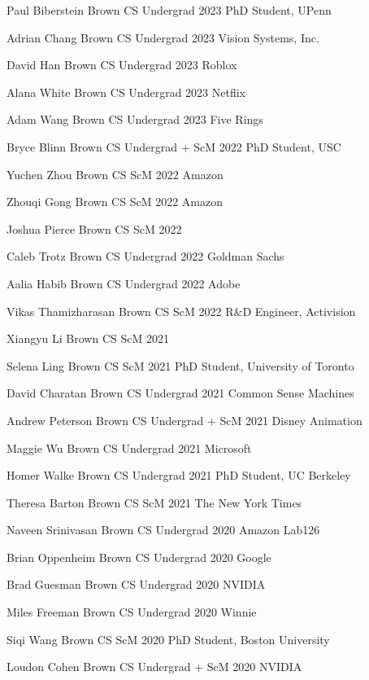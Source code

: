 \documentclass[line,margin]{res}
\begin{document}
\begin{resume}
\alumni
{Paul Biberstein}
{Brown CS Undergrad}
{2023}
{PhD Student, UPenn}

\alumni
{Adrian Chang}
{Brown CS Undergrad}
{2023}
{Vision Systems, Inc.}

\alumni
{David Han}
{Brown CS Undergrad}
{2023}
{Roblox}

\alumni
{Alana White}
{Brown CS Undergrad}
{2023}
{Netflix}

\alumni
{Adam Wang}
{Brown CS Undergrad}
{2023}
{Five Rings}

\alumni
{Bryce Blinn}
{Brown CS Undergrad + ScM}
{2022}	
{PhD Student, USC}

\alumni
{Yuchen Zhou}
{Brown CS ScM}
{2022}
{Amazon}

\alumni
{Zhouqi Gong}
{Brown CS ScM}
{2022}
{Amazon}

\alumni
{Joshua Pierce}
{Brown CS ScM}
{2022}
{}

\alumni
{Caleb Trotz}
{Brown CS Undergrad}
{2022}
{Goldman Sachs}

\alumni
{Aalia Habib}
{Brown CS Undergrad}
{2022}
{Adobe}

\alumni
{Vikas Thamizharasan}
{Brown CS ScM}
{2022}
{R\&D Engineer, Activision}

\alumni
{Xiangyu Li}
{Brown CS ScM}
{2021}
{}

\alumni
{Selena Ling}
{Brown CS ScM}
{2021}
{PhD Student, University of Toronto}

\alumni
{David Charatan}
{Brown CS Undergrad}
{2021}
{Common Sense Machines}

\alumni
{Andrew Peterson}
{Brown CS Undergrad + ScM}
{2021}
{Disney Animation}

\alumni
{Maggie Wu}
{Brown CS Undergrad}
{2021}
{Microsoft}

\alumni
{Homer Walke}
{Brown CS Undergrad}
{2021}
{PhD Student, UC Berkeley}

\alumni
{Theresa Barton}
{Brown CS ScM}
{2021}
{The New York Times}

\alumni
{Naveen Srinivasan}
{Brown CS Undergrad}
{2020}
{Amazon Lab126}

\alumni
{Brian Oppenheim}
{Brown CS Undergrad}
{2020}
{Google}

\alumni
{Brad Guesman}
{Brown CS Undergrad}
{2020}
{NVIDIA}

\alumni
{Miles Freeman}
{Brown CS Undergrad}
{2020}
{Winnie}

\alumni
{Siqi Wang}
{Brown CS ScM}
{2020}
{PhD Student, Boston University}

\alumni
{Loudon Cohen}
{Brown CS Undergrad + ScM}
{2020}
{NVIDIA}


\end{resume}
\end{document}
